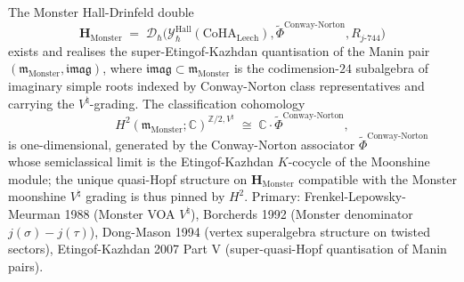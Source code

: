\begin{theorem}
\label{thm:k3ebkm-monster-super-ek}
The Monster Hall-Drinfeld double
\[
 \mathbf H_{\mathrm{Monster}}
 \;=\;
 \mathcal D_\hbar\bigl(\mathcal Y^{\mathrm{Hall}}_\hbar(\mathrm{CoHA}_{\mathrm{Leech}}),
 \widetilde\Phi^{\mathrm{Conway\text{-}Norton}},
 R_{j\text{-}744}\bigr)
\]
exists and realises the super-Etingof-Kazhdan quantisation of the Manin
pair $(\mathfrak m_{\mathrm{Monster}}, \mathfrak{imag})$, where
$\mathfrak{imag}\subset\mathfrak m_{\mathrm{Monster}}$ is the
codimension-$24$ subalgebra of imaginary simple roots indexed by
Conway-Norton class representatives and carrying the $V^\natural$-grading.
The classification cohomology
\[
 H^2(\mathfrak m_{\mathrm{Monster}};\mathbb C)^{\mathbb Z/2, V^\natural}
 \;\cong\; \mathbb C\cdot\widetilde\Phi^{\mathrm{Conway\text{-}Norton}},
\]
is one-dimensional, generated by the Conway-Norton associator
$\widetilde\Phi^{\mathrm{Conway\text{-}Norton}}$ whose semiclassical
limit is the Etingof-Kazhdan $K$-cocycle of the Moonshine module;
the unique quasi-Hopf structure on $\mathbf H_{\mathrm{Monster}}$
compatible with the Monster moonshine $V^\natural$ grading is thus
pinned by $H^2$. Primary: Frenkel-Lepowsky-Meurman 1988 (Monster VOA
$V^\natural$), Borcherds 1992 (Monster denominator $j(\sigma)-j(\tau)$),
Dong-Mason 1994 (vertex superalgebra structure on twisted sectors),
Etingof-Kazhdan 2007 Part V (super-quasi-Hopf quantisation of
Manin pairs).
\end{theorem}

